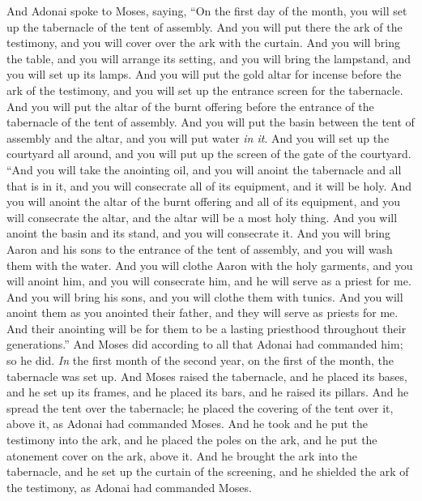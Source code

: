 \begin{biblechapter} %
 And Adonai spoke to Moses, saying,
\verse “On the first day of the month, you will set up the tabernacle of the tent of assembly.
\verse And you will put there the ark of the testimony, and you will cover over the ark with the curtain.
\verse And you will bring the table, and you will arrange its setting, and you will bring the lampstand, and you will set up its lamps.
\verse And you will put the gold altar for incense before the ark of the testimony, and you will set up the entrance screen for the tabernacle.
\verse And you will put the altar of the burnt offering before the entrance of the tabernacle of the tent of assembly.
\verse And you will put the basin between the tent of assembly and the altar, and you will put water \textit{in it}.
\verse And you will set up the courtyard all around, and you will put up the screen of the gate of the courtyard.
\verse “And you will take the anointing oil, and you will anoint the tabernacle and all that is in it, and you will consecrate all of its equipment, and it will be holy.
\verse And you will anoint the altar of the burnt offering and all of its equipment, and you will consecrate the altar, and the altar will be a most holy thing.
\verse And you will anoint the basin and its stand, and you will consecrate it.
\verse And you will bring Aaron and his sons to the entrance of the tent of assembly, and you will wash them with the water.
\verse And you will clothe Aaron with the holy garments, and you will anoint him, and you will consecrate him, and he will serve as a priest for me.
\verse And you will bring his sons, and you will clothe them with tunics.
\verse And you will anoint them as you anointed their father, and they will serve as priests for me. And their anointing will be for them to be a lasting priesthood throughout their generations.”
\verse And Moses did according to all that Adonai had commanded him; so he did.
\verse \textit{In} the first month of the second year, on the first of the month, the tabernacle was set up.
\verse And Moses raised the tabernacle, and he placed its bases, and he set up its frames, and he placed its bars, and he raised its pillars.
\verse And he spread the tent over the tabernacle; he placed the covering of the tent over it, above it, as Adonai had commanded Moses.
\verse And he took and he put the testimony into the ark, and he placed the poles on the ark, and he put the atonement cover on the ark, above it.
\verse And he brought the ark into the tabernacle, and he set up the curtain of the screening, and he shielded the ark of the testimony, as Adonai had commanded Moses.

\end{biblechapter}
